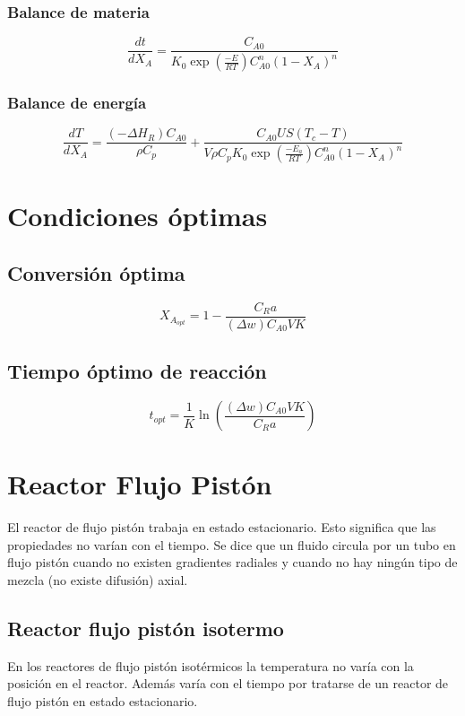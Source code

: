 \documentclass[20pt,a4paper]{extarticle}
\begin{document}
		\subsubsection{Balance de materia}
			\begin{equation*}
				\frac{dt}{dX_A} = \frac{C_{A0}}{K_0 \exp\left(\frac{-E}{RT}\right) C_{A0}^n (1-X_A)^n}
			\end{equation*}
			
		\subsubsection{Balance de energía}
			\begin{equation*}
				\frac{dT}{dX_A} = \frac{(-\Delta H_R)C_{A0}}{\rho C_p} + \frac{C_{A0}US(T_c-T)}{V\rho C_p K_0 \exp\left(\frac{-E_a}{RT}\right)C_{A0}^n(1-X_A)^n}
			\end{equation*}
			
\section{Condiciones óptimas}
	\subsection{Conversión óptima}
		\begin{equation*}
			X_{A_{opt}} = 1- \frac{C_R a}{(\Delta w) C_{A0}VK}
		\end{equation*}		
		
	\subsection{Tiempo óptimo de reacción}
		\begin{equation*}
			t_{opt} = \frac{1}{K}\ln \left(\frac{(\Delta w)C_{A0}VK}{C_R a}\right)
		\end{equation*}
		
		
\section{Reactor Flujo Pistón}
		
	El reactor de flujo pistón trabaja en estado estacionario. Esto significa que las propiedades no varían con el tiempo. Se dice que un fluido circula por un tubo en flujo pistón cuando no existen gradientes radiales y cuando no hay ningún tipo de mezcla (no existe difusión) axial.
		
	\subsection{Reactor flujo pistón isotermo}
		En los reactores de flujo pistón isotérmicos la temperatura no varía con la posición en el reactor. Además varía con el tiempo por tratarse de un reactor de flujo pistón en estado estacionario.
		
\end{document}
